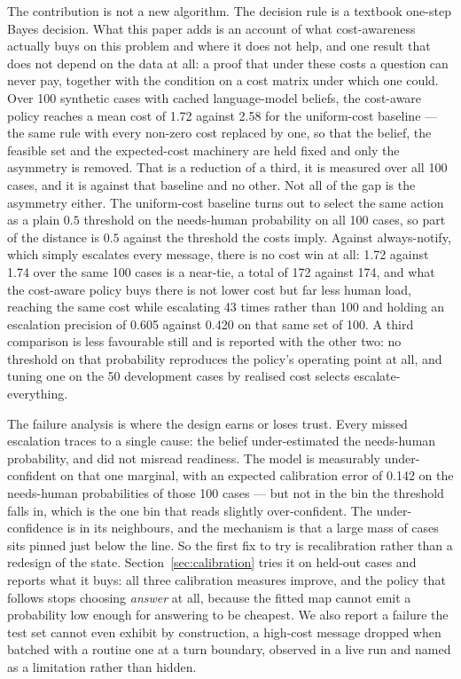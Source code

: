 \documentclass{article}
\begin{document}
The contribution is not a new algorithm. The decision rule is a textbook
one-step Bayes decision. What this paper adds is an account of what
cost-awareness actually buys on this problem and where it does not help, and one
result that does not depend on the data at all: a proof that under these costs a
question can never pay, together with the condition on a cost matrix under which
one could.
Over 100 synthetic cases with cached language-model beliefs, the cost-aware
policy reaches a mean cost of 1.72 against 2.58 for the uniform-cost baseline ---
the same rule with every non-zero cost replaced by one, so that the belief, the
feasible set and the expected-cost machinery are held fixed and only the asymmetry
is removed. That is a reduction of a third, it is measured over all 100 cases, and
it is against that baseline and no other. Not all of the gap is the asymmetry
either. The uniform-cost baseline turns out to select the same action as a plain
$0.5$ threshold on the needs-human probability on all 100 cases, so part of the
distance is $0.5$ against the threshold the costs imply. Against always-notify,
which simply escalates every message, there is no cost win at all: 1.72 against
1.74 over the same 100 cases is a near-tie, a total of 172 against 174, and
what the cost-aware policy buys there is not lower cost but far less human load,
reaching the same cost while escalating 43 times rather than 100 and holding an
escalation precision of 0.605 against 0.420 on that same set of 100. A third
comparison is less favourable still and is reported with the other two: no
threshold on that probability reproduces the policy's operating point at all, and
tuning one on the 50 development cases by realised cost selects
escalate-everything.

The failure analysis is where the design earns or loses trust. Every missed
escalation traces to a single cause: the belief under-estimated the needs-human
probability, and did not misread readiness. The model is measurably
under-confident on that one marginal, with an expected calibration error of 0.142
on the needs-human probabilities of those 100 cases --- but not in the bin the
threshold falls in, which is the one bin that reads slightly over-confident. The
under-confidence is in its neighbours, and the mechanism is that a large mass of
cases sits pinned just below the line. So the first fix to try is recalibration
rather than a redesign of the state. Section~\ref{sec:calibration} tries it on
held-out cases and reports what it buys: all three calibration measures improve,
and the policy that follows stops choosing \emph{answer} at all, because the
fitted map cannot emit a probability low enough for answering to be cheapest. We
also report a failure the test set cannot even exhibit by construction, a
high-cost message dropped when batched with a routine one at a turn boundary,
observed in a live run and named as a limitation rather than hidden.
\end{document}
